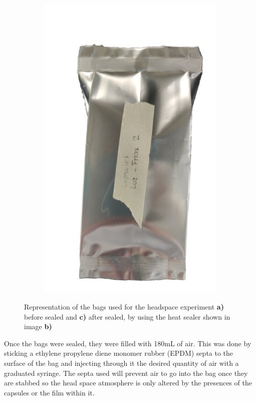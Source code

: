 \begin{refsection}
\begin{figure}[h]
\begin{subfigure}[b]{0.3\linewidth}
        \caption{ }
        \label{fig:sealer}
    \end{subfigure}
    \begin{subfigure}[b]{0.3\linewidth}
        \centering
        \includegraphics[width=0.8\linewidth]{Documento_Latex/Tesis 2/Imagenes/Sealed_Bag.png}
        \caption{ }
        \label{fig:sealed_bag}
    \end{subfigure}
    \caption{Representation of the bags used for the headspace experiment \textbf{a)} before sealed and \textbf{c)} after sealed,  by using the heat sealer shown in image \textbf{b)}}
    \label{fig:bags}
\end{figure}

Once the bags were sealed, they were filled with 180mL of air. This was done by sticking a ethylene propylene diene monomer rubber (EPDM) septa to the surface of the bag and injecting through it the desired quantity of air with a graduated syringe. The septa used will prevent air to go into the bag once they are stabbed so the head space atmosphere is only altered by the presences of the capsules or the film within it.


\end{refsection}

